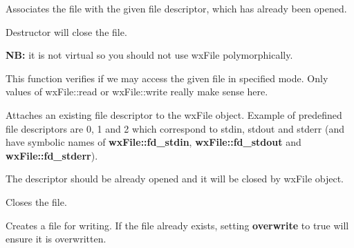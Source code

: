 Associates the file with the given file descriptor, which has already been opened.







Destructor will close the file.

{\bf NB:} it is not virtual so you should not use wxFile polymorphically.

\label{wxfileaccess}


This function verifies if we may access the given file in specified mode. Only
values of wxFile::read or wxFile::write really make sense here.

\label{wxfileattach}


Attaches an existing file descriptor to the wxFile object. Example of predefined
file descriptors are 0, 1 and 2 which correspond to stdin, stdout and stderr (and
have symbolic names of {\bf wxFile::fd\_stdin}, {\bf wxFile::fd\_stdout} and {\bf wxFile::fd\_stderr}).

The descriptor should be already opened and it will be closed by wxFile
object.

\label{wxfileclose}


Closes the file.

\label{wxfilecreate}


Creates a file for writing. If the file already exists, setting {\bf overwrite} to true
will ensure it is overwritten.

\label{wxfiledetach}

